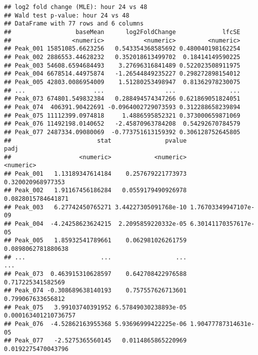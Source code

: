 \documentclass[]{article}
\newenvironment{Shaded}{\begin{snugshade}}{\end{snugshade}}
\newcommand{\KeywordTok}[1]{\textcolor[rgb]{0.13,0.29,0.53}{\textbf{#1}}}
\newcommand{\DataTypeTok}[1]{\textcolor[rgb]{0.13,0.29,0.53}{#1}}
\newcommand{\DecValTok}[1]{\textcolor[rgb]{0.00,0.00,0.81}{#1}}
\newcommand{\StringTok}[1]{\textcolor[rgb]{0.31,0.60,0.02}{#1}}
\newcommand{\OperatorTok}[1]{\textcolor[rgb]{0.81,0.36,0.00}{\textbf{#1}}}
\newcommand{\NormalTok}[1]{#1}
\begin{document}
\begin{verbatim}
## log2 fold change (MLE): hour 24 vs 48 
## Wald test p-value: hour 24 vs 48 
## DataFrame with 77 rows and 6 columns
##                  baseMean      log2FoldChange             lfcSE
##                 <numeric>           <numeric>         <numeric>
## Peak_001 15851085.6623256   0.543354368585692 0.480040198162254
## Peak_002 2886553.44628232   0.352018613499702  0.18414149590225
## Peak_003 54608.6594684493    3.27696316841489 0.522023508911975
## Peak_004 6678514.44975874   -1.26544849235227 0.298272898154012
## Peak_005 42803.0086954009    1.51280253498947  0.81362978230075
## ...                   ...                 ...               ...
## Peak_073 674801.549832384   0.288494574347266 0.621869051824051
## Peak_074  406391.90422691 -0.0964002729073593 0.312288658239894
## Peak_075 11112399.0974818     1.4886595852321 0.373000659871069
## Peak_076 11492198.0140652   -2.45870963784208  0.54292670784579
## Peak_077 2487334.09080069  -0.773751613159392 0.306128752645805
##                        stat               pvalue                 padj
##                   <numeric>            <numeric>            <numeric>
## Peak_001   1.13189347614184    0.257679221773973    0.320020968977353
## Peak_002   1.91167456186284   0.0559179490926978   0.0828015784641871
## Peak_003   6.27742450765271 3.44227305091768e-10 1.76703349947107e-09
## Peak_004  -4.24258623624215  2.2095859220332e-05 6.30141170357617e-05
## Peak_005   1.85932541789661    0.062981026261759   0.0898062781880638
## ...                     ...                  ...                  ...
## Peak_073  0.463915310628597    0.642708422976588    0.717225341582569
## Peak_074 -0.308689638140193    0.757557626713601    0.799067633656812
## Peak_075   3.99103740391952 6.57849030238893e-05 0.000163401210736757
## Peak_076  -4.52862163955368 5.93696999422225e-06 1.90477787314631e-05
## Peak_077   -2.5275365560145   0.0114865865220969   0.0192275470043796
\end{verbatim}

\begin{Shaded}
\end{Shaded}
\end{document}
